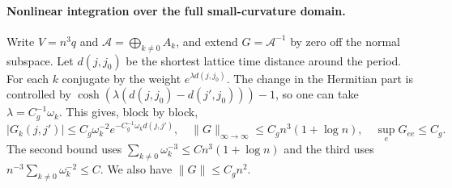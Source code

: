 \documentclass[11pt,a4paper]{article}
\numberwithin{equation}{section}
\begin{document}
\paragraph{Nonlinear integration over the full small-curvature domain.}
Write \(V=n^3q\) and \(\mathcal A=\bigoplus_{k\ne0}A_k\), and extend \(G=\mathcal A^{-1}\) by zero off the normal subspace. Let \(d(j,j_0)\) be the shortest lattice time distance around the period. For each \(k\) conjugate by the weight \(e^{\lambda d(j,j_0)}\). The change in the Hermitian part is controlled by
\(\cosh(\lambda(d(j,j_0)-d(j',j_0)))-1\), so one can take \(\lambda=C_g^{-1}\omega_k\). This gives, block by block,
\begin{equation}
 |G_k(j,j')|\le C_g\omega_k^{-2}e^{-C_g^{-1}\omega_k d(j,j')},
 \quad \|G\|_{\infty\to\infty}\le C_g n^3(1+\log n),
 \quad \sup_eG_{ee}\le C_g .
 \label{eq:cam-soft-fastinv}
\end{equation}
The second bound uses \(\sum_{k\ne0}\omega_k^{-3}\le C n^3(1+\log n)\) and the third uses \(n^{-3}\sum_{k\ne0}\omega_k^{-2}\le C\). We also have \(\|G\|\le C_g n^2\).
\end{document}
